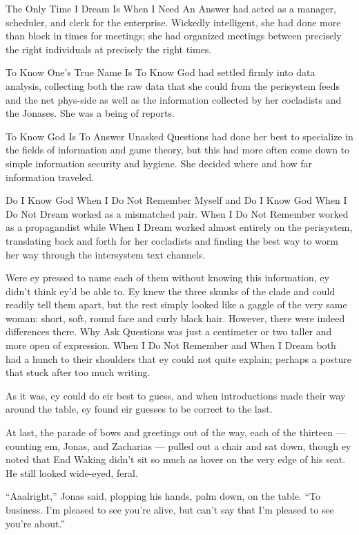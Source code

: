The Only Time I Dream Is When I Need An Answer had acted as a manager, scheduler, and clerk for the enterprise. Wickedly intelligent, she had done more than block in times for meetings; she had organized meetings between precisely the right individuals at precisely the right times.

To Know One's True Name Is To Know God had settled firmly into data analysis, collecting both the raw data that she could from the perisystem feeds and the net phys-side as well as the information collected by her cocladists and the Jonases. She was a being of reports.

To Know God Is To Answer Unasked Questions had done her best to specialize in the fields of information and game theory, but this had more often come down to simple information security and hygiene. She decided where and how far information traveled.

Do I Know God When I Do Not Remember Myself and Do I Know God When I Do Not Dream worked as a mismatched pair. When I Do Not Remember worked as a propagandist while When I Dream worked almost entirely on the perisystem, translating back and forth for her cocladists and finding the best way to worm her way through the intersystem text channels.

Were ey pressed to name each of them without knowing this information, ey didn't think ey'd be able to. Ey knew the three skunks of the clade and could readily tell them apart, but the rest simply looked like a gaggle of the very same woman: short, soft, round face and curly black hair. However, there were indeed differences there. Why Ask Questions was just a centimeter or two taller and more open of expression. When I Do Not Remember and When I Dream both had a hunch to their shoulders that ey could not quite explain; perhaps a posture that stuck after too much writing.

As it was, ey could do eir best to guess, and when introductions made their way around the table, ey found eir guesses to be correct to the last.

At last, the parade of bows and greetings out of the way, each of the thirteen — counting em, Jonas, and Zacharias — pulled out a chair and sat down, though ey noted that End Waking didn't sit so much as hover on the very edge of his seat. He still looked wide-eyed, feral.

``Aaalright,'' Jonas said, plopping his hands, palm down, on the table. ``To business. I'm pleased to see you're alive, but can't say that I'm pleased to see you're about.''

